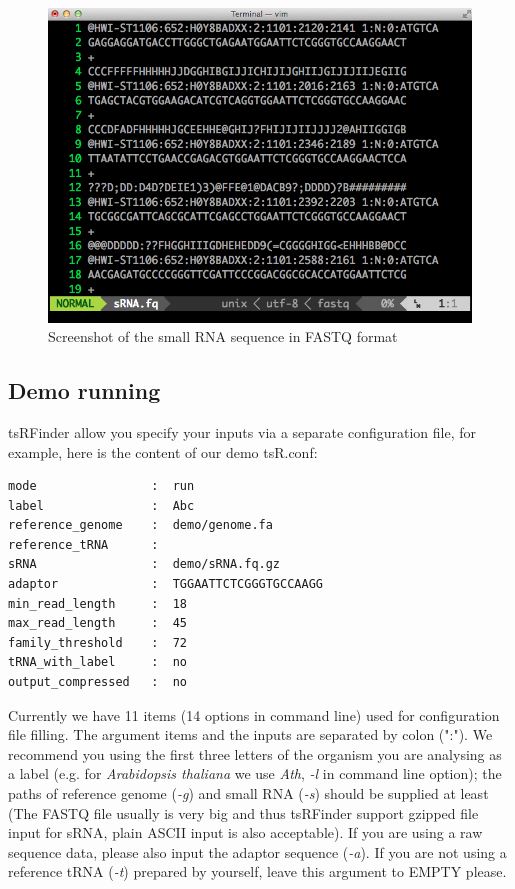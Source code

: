 \documentclass[11pt, a4paper]{article}
\begin{document}
\begin{figure}[htbp]
\begin{center}
\includegraphics[width=12cm]{fastq.png}
\caption{Screenshot of the small RNA sequence in FASTQ format} 
\label{fastq}
\end{center}
\end{figure}

\subsection{Demo running}

tsRFinder allow you specify your inputs via a separate configuration file, for example, here is the content of our demo tsR.conf:

{\footnotesize \begin{tcolorbox}[colback=blue!5!white,colframe=blue!75!black,title=Demo configuration file for tsRFinder: demo/tsR.conf]
\begin{verbatim}
mode                :  run
label               :  Abc
reference_genome    :  demo/genome.fa 
reference_tRNA      :
sRNA                :  demo/sRNA.fq.gz
adaptor             :  TGGAATTCTCGGGTGCCAAGG
min_read_length     :  18
max_read_length     :  45
family_threshold    :  72
tRNA_with_label     :  no
output_compressed   :  no
\end{verbatim}
\end{tcolorbox}}

Currently we have 11 items (14 options in command line) used for configuration file filling. The argument items and the inputs are separated by colon (":"). We recommend you using the first three letters of the organism you are analysing as a label (e.g. for \textit{Arabidopsis thaliana} we use \textit{Ath}, \emph{-l} in command line option); the paths of reference genome (\emph{-g}) and small RNA (\emph{-s}) should be supplied at least (The FASTQ file usually is very big and thus tsRFinder support gzipped file input for sRNA, plain ASCII input is also acceptable). If you are using a raw sequence data, please also input the adaptor sequence (\emph{-a}). If you are not using a reference tRNA (\emph{-t}) prepared by yourself, leave this argument to EMPTY please.
\end{document}
